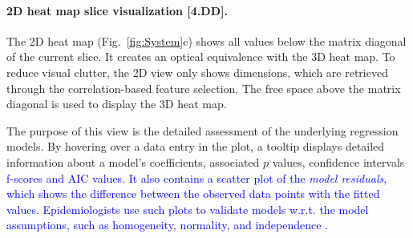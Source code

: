 \documentclass[journal]{style/vgtc} 			          %
\newcommand{\add}[1]{\textcolor{blue}{#1}}
\begin{document}
\paragraph{2D heat map slice visualization [\textbf{4.DD}].}
The 2D heat map (Fig.~\ref{fig:System}c) shows all values below the matrix diagonal of the current slice.
It creates an optical equivalence with the 3D heat map.
To reduce visual clutter, the 2D view only shows dimensions, which are retrieved through the correlation-based feature selection.
The free space above the matrix diagonal is used to display the 3D heat map.

The purpose of this view is the detailed assessment of the underlying regression models.
By hovering over a data entry in the plot, a tooltip displays detailed information about a model's coefficients, associated $p$ values, confidence intervals \add{f-scores and AIC values}.
\add{
It also contains a scatter plot of the \emph{model residuals}, which shows the difference between the observed data points with the fitted values.
Epidemiologists use such plots to validate models w.r.t. the model assumptions, such as homogeneity, normality, and independence \cite{GraphicModelAssessment}.
}
\end{document}
